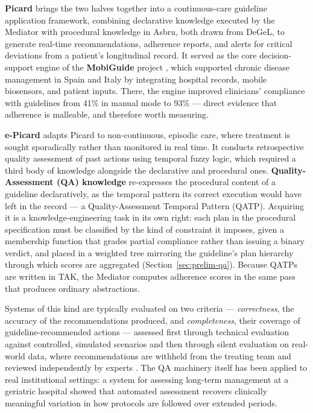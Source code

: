 \textbf{Picard} \citep{architecture-continuous-user-driven-data-driven-application-clinical-guidelines} brings the two halves together into a continuous-care guideline application framework, combining declarative knowledge executed by the Mediator with procedural knowledge in Asbru, both drawn from DeGeL, to generate real-time recommendations, adherence reports, and alerts for critical deviations from a patient's longitudinal record. It served as the core decision-support engine of the \textbf{MobiGuide} project \citep{mobiguide-guiding-clinicians-and-chronic-patients-anytime-anywhere}, which supported chronic disease management in Spain and Italy by integrating hospital records, mobile biosensors, and patient inputs. There, the engine improved clinicians' compliance with guidelines from 41\% in manual mode to 93\% --- direct evidence that adherence is malleable, and therefore worth measuring.

\textbf{e-Picard} \citep{supporting-episodic-application-clinical-guidelines} adapts Picard to non-continuous, episodic care, where treatment is sought sporadically rather than monitored in real time. It conducts retrospective quality assessment of past actions using temporal fuzzy logic, which required a third body of knowledge alongside the declarative and procedural ones. \textbf{Quality-Assessment (QA) knowledge} re-expresses the procedural content of a guideline declaratively, as the temporal pattern its correct execution would have left in the record --- a Quality-Assessment Temporal Pattern (QATP). Acquiring it is a knowledge-engineering task in its own right: each plan in the procedural specification must be classified by the kind of constraint it imposes, given a membership function that grades partial compliance rather than issuing a binary verdict, and placed in a weighted tree mirroring the guideline's plan hierarchy through which scores are aggregated (Section~\ref{sec:prelim-qa}). Because QATPs are written in TAK, the Mediator computes adherence scores in the same pass that produces ordinary abstractions.

Systems of this kind are typically evaluated on two criteria --- \emph{correctness}, the accuracy of the recommendations produced, and \emph{completeness}, their coverage of guideline-recommended actions --- assessed first through technical evaluation against controlled, simulated scenarios and then through silent evaluation on real-world data, where recommendations are withheld from the treating team and reviewed independently by experts \citep{multiple-scenario-assessment-guideline-based-decision-support-compliance}. The QA machinery itself has been applied to real institutional settings: a system for assessing long-term management at a geriatric hospital \citep{implementation-evaluation-long-term-geriatric-hospital-quality} showed that automated assessment recovers clinically meaningful variation in how protocols are followed over extended periods.

